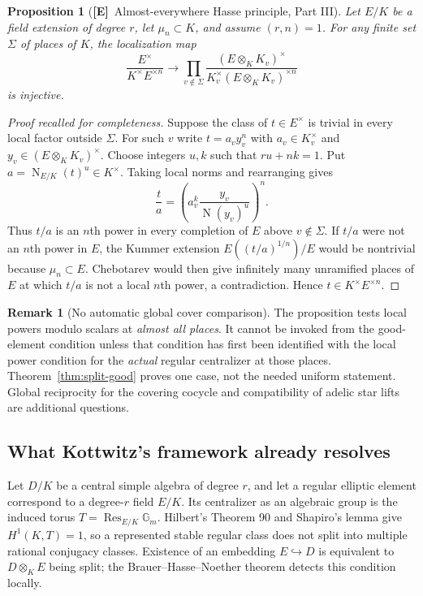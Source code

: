 \documentclass[11pt]{article}
\newcommand{\N}{\operatorname{N}}
\newcommand{\Etag}{\textnormal{\textbf{[E]}}}
\theoremstyle{plain}
\newtheorem{proposition}[theorem]{Proposition}
\theoremstyle{definition}
\newtheorem{remark}[theorem]{Remark}
\begin{document}
\begin{proposition}[\Etag\ Almost-everywhere Hasse principle, Part III]\label{prop:hasse}
Let $E/K$ be a field extension of degree $r$, let $\mu_n\subset K$,
and assume $(r,n)=1$.  For any finite set $\Sigma$ of places of $K$,
the localization map
\begin{equation}\label{eq:hasse}
 \frac{E^\times}{K^\times E^{\times n}}
 \longrightarrow
 \prod_{v\notin\Sigma}
 \frac{(E\otimes_KK_v)^\times}
 {K_v^\times(E\otimes_KK_v)^{\times n}}
\end{equation}
is injective.
\end{proposition}
\begin{proof}[Proof recalled for completeness]
Suppose the class of $t\in E^\times$ is trivial in every local
factor outside $\Sigma$.  For such $v$ write $t=a_vy_v^n$ with
$a_v\in K_v^\times$ and $y_v\in(E\otimes_KK_v)^\times$.
Choose integers $u,k$ such that $ru+nk=1$.  Put
$a=\N_{E/K}(t)^u\in K^\times$.  Taking local norms and rearranging
gives
\[
 \frac ta=\left(a_v^k\frac{y_v}{\N(y_v)^u}\right)^n.
\]
Thus $t/a$ is an $n$th power in every completion of $E$ above
$v\notin\Sigma$.  If $t/a$ were not an $n$th power in $E$, the
Kummer extension $E((t/a)^{1/n})/E$ would be nontrivial because
$\mu_n\subset E$.  Chebotarev would then give infinitely many
unramified places of $E$ at which $t/a$ is not a local $n$th
power, a contradiction.  Hence $t\in K^\times E^{\times n}$.
\end{proof}

\begin{remark}[No automatic global cover comparison]
The proposition tests local powers modulo scalars at \emph{almost all
places}.  It cannot be invoked from the good-element condition unless
that condition has first been identified with the local power
condition for the \emph{actual} regular centralizer at those places.
Theorem~\ref{thm:split-good} proves one case, not the needed
uniform statement.  Global reciprocity for the covering cocycle and
compatibility of adelic star lifts are additional questions.
\end{remark}

\subsection{What Kottwitz's framework already resolves}
Let $D/K$ be a central simple algebra of degree $r$, and let a
regular elliptic element correspond to a degree-$r$ field $E/K$.
Its centralizer as an algebraic group is the induced torus
$T=\operatorname{Res}_{E/K}\mathbb G_m$.  Hilbert's Theorem 90 and
Shapiro's lemma give $H^1(K,T)=1$, so a represented stable regular
class does not split into multiple rational conjugacy classes.
Existence of an embedding $E\hookrightarrow D$ is equivalent to
$D\otimes_KE$ being split; the Brauer--Hasse--Noether theorem detects
this condition locally.
\end{document}
